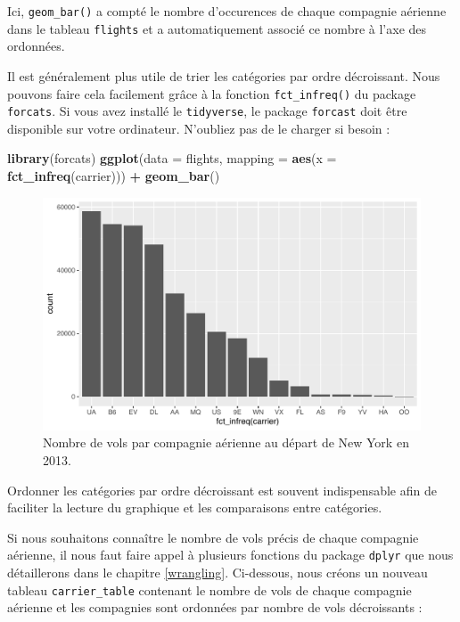 \documentclass[a4paperpaper,]{article}
\newenvironment{Shaded}{\begin{snugshade}}{\end{snugshade}}
\newcommand{\KeywordTok}[1]{\textcolor[rgb]{0.13,0.29,0.53}{\textbf{#1}}}
\newcommand{\DataTypeTok}[1]{\textcolor[rgb]{0.13,0.29,0.53}{#1}}
\newcommand{\StringTok}[1]{\textcolor[rgb]{0.31,0.60,0.02}{#1}}
\newcommand{\OperatorTok}[1]{\textcolor[rgb]{0.81,0.36,0.00}{\textbf{#1}}}
\newcommand{\NormalTok}[1]{#1}
\theoremstyle{definition}
\theoremstyle{definition}
\theoremstyle{definition}
\theoremstyle{remark}
\begin{document}
Ici, \texttt{geom\_bar()} a compté le nombre d'occurences de chaque
compagnie aérienne dans le tableau \texttt{flights} et a automatiquement
associé ce nombre à l'axe des ordonnées.

Il est généralement plus utile de trier les catégories par ordre
décroissant. Nous pouvons faire cela facilement grâce à la fonction
\texttt{fct\_infreq()} du package \texttt{forcats}. Si vous avez
installé le \texttt{tidyverse}, le package \texttt{forcast} doit être
disponible sur votre ordinateur. N'oubliez pas de le charger si besoin :

\begin{Shaded}
\begin{Highlighting}[]
\KeywordTok{library}\NormalTok{(forcats)}
\KeywordTok{ggplot}\NormalTok{(}\DataTypeTok{data =}\NormalTok{ flights, }\DataTypeTok{mapping =} \KeywordTok{aes}\NormalTok{(}\DataTypeTok{x =} \KeywordTok{fct_infreq}\NormalTok{(carrier))) }\OperatorTok{+}
\StringTok{  }\KeywordTok{geom_bar}\NormalTok{()}
\end{Highlighting}
\end{Shaded}

\begin{figure}[htpb]

{\centering \includegraphics[width=0.9\linewidth]{figure/bpcarriersorted-1} 

}

\caption{Nombre de vols par compagnie aérienne au départ de New York en 2013.}\label{fig:bpcarriersorted}
\end{figure}

Ordonner les catégories par ordre décroissant est souvent indispensable
afin de faciliter la lecture du graphique et les comparaisons entre
catégories.

Si nous souhaitons connaître le nombre de vols précis de chaque
compagnie aérienne, il nous faut faire appel à plusieurs fonctions du
package \texttt{dplyr} que nous détaillerons dans le chapitre
\ref{wrangling}. Ci-dessous, nous créons un nouveau tableau
\texttt{carrier\_table} contenant le nombre de vols de chaque compagnie
aérienne et les compagnies sont ordonnées par nombre de vols
décroissants :
\end{document}
